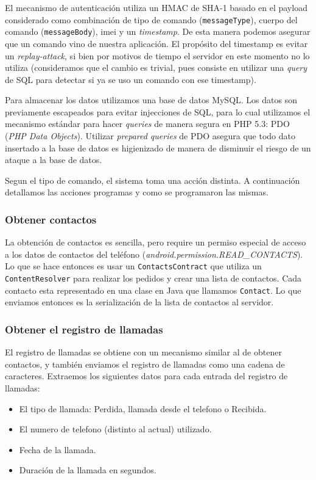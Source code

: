 El mecanismo de autenticación utiliza un HMAC de SHA-1 basado en el payload considerado como combinación de tipo de comando (\texttt{messageType}),
cuerpo del comando (\texttt{messageBody}), imei y un \textit{timestamp}. De esta manera podemos asegurar que un comando vino de nuestra
aplicación. El propósito del timestamp es evitar un \textit{replay-attack}, si bien por motivos de tiempo el servidor en este momento no lo
utiliza (consideramos que el cambio es trivial, pues consiste en utilizar una \textit{query} de SQL para detectar si ya se uso un comando con
ese timestamp).

Para almacenar los datos utilizamos una base de datos MySQL. Los datos son previamente escapeados para evitar
injecciones de SQL, para lo cual utilizamos el mecanismo estándar para hacer \textit{queries} de manera
segura en PHP 5.3: PDO (\textit{PHP Data Objects}). Utilizar \textit{prepared queries} de PDO asegura que
todo dato insertado a la base de datos es higienizado de manera de disminuir el riesgo de un ataque a
la base de datos.

Segun el tipo de comando, el sistema toma una acción distinta. A continuación detallamos las acciones programas y como se programaron las mismas.

\subsubsection{Obtener contactos}

La obtención de contactos es sencilla, pero require un permiso especial de acceso a los
datos de contactos del teléfono (\textit{android.permission.READ\_CONTACTS}). Lo que se hace
entonces es usar un \texttt{ContactsContract} que utiliza un \texttt{ContentResolver} para
realizar los pedidos y crear una lista de contactos. Cada contacto esta representado en una
clase en Java que llamamos \texttt{Contact}. Lo que enviamos entonces es la serialización
de la lista de contactos al servidor.

\subsubsection{Obtener el registro de llamadas}

El registro de llamadas se obtiene con un mecanismo similar al de obtener contactos, y también
enviamos el registro de llamadas como una cadena de caracteres. Extraemos los siguientes datos
para cada entrada del registro de llamadas:

\begin{itemize}
	\item El tipo de llamada: Perdida, llamada desde el telefono o Recibida.
	\item El numero de telefono (distinto al actual) utilizado.
	\item Fecha de la llamada.
	\item Duración de la llamada en segundos.
\end{itemize}

